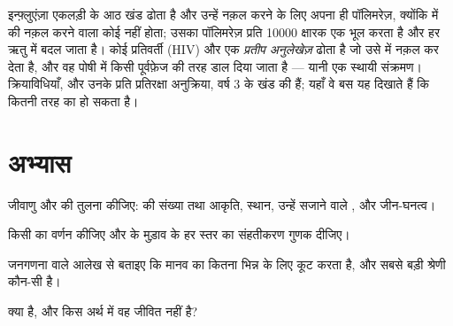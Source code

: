 \begin{example}[RNA जीनोम वाले विषाणु]\label{ex:b1:genomes:rna}
इन्फ़्लुएंज़ा एकलड़ी  के आठ खंड ढोता है और उन्हें नक़ल करने के लिए
अपना ही पॉलिमरेज़, क्योंकि  में  की नक़ल करने वाला कोई 
नहीं होता; उसका पॉलिमरेज़ प्रति \num{10000} क्षारक एक भूल करता है और
 हर ऋतु में बदल जाता है। कोई प्रतिवर्ती  (HIV)  और एक
\emph{प्रतीप अनुलेखेज़} ढोता है जो उसे  में नक़ल कर देता है, और वह
पोषी  में किसी पूर्वफ़ेज की तरह डाल दिया जाता है --- यानी एक
स्थायी संक्रमण। क्रियाविधियाँ, और उनके प्रति प्रतिरक्षा अनुक्रिया, वर्ष 3
के खंड की हैं; यहाँ वे बस यह दिखाते हैं कि  कितनी तरह का हो सकता है।
\end{example}

\section{अभ्यास}

\begin{exercise}[$\star$]\label{exo:b1:genomes:1}
जीवाणु और   की तुलना कीजिए:  की संख्या तथा
आकृति, स्थान, उन्हें सजाने वाले , और जीन-घनत्व।
\end{exercise}

\begin{exercise}[$\star$]\label{exo:b1:genomes:2}
किसी  का वर्णन कीजिए और  के मुड़ाव के हर स्तर का
संहतीकरण गुणक दीजिए।
\end{exercise}

\begin{exercise}[$\star$]\label{exo:b1:genomes:3}
जनगणना वाले आलेख से बताइए कि मानव  का कितना भिन्न  के लिए कूट
करता है, और सबसे बड़ी श्रेणी कौन-सी है।
\end{exercise}

\begin{exercise}[$\star$]\label{exo:b1:genomes:4}
 क्या है, और किस अर्थ में वह जीवित नहीं है?
\end{exercise}

